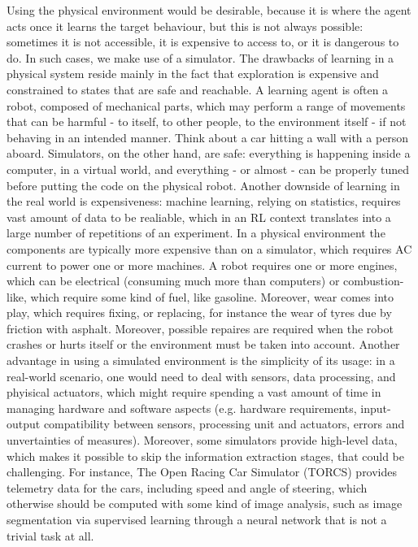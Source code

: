 Using the physical environment would be desirable, because it is where the agent acts once it learns the target behaviour, but this is not always possible: sometimes it is not accessible, it is expensive to access to, or it is dangerous to do. In such cases, we make use of a simulator. 
The drawbacks of learning in a physical system reside mainly in the fact that exploration is expensive and constrained to states that are safe and reachable. A learning agent is often a robot, composed of mechanical parts, which may perform a range of movements that can be harmful - to itself, to other people, to the environment itself - if not behaving in an intended manner. Think about a car hitting a wall with a person aboard. Simulators, on the other hand, are safe: everything is happening inside a computer, in a virtual world, and everything - or almost - can be properly tuned before putting the code on the physical robot. Another downside of learning in the real world is expensiveness: machine learning, relying on statistics, requires vast amount of data to be realiable, which in an RL context translates into a large number of repetitions of an experiment. In a physical environment the components are typically more expensive than on a simulator, which requires AC current to power one or more machines. A robot requires one or more engines, which can be electrical (consuming much more than computers) or combustion-like, which require some kind of fuel, like gasoline. Moreover, wear comes into play, which requires fixing, or replacing, for instance the wear of tyres due by friction with asphalt.  Moreover, possible repaires are required when the robot crashes or hurts itself or the environment must be taken into account. 
Another advantage in using a simulated environment is the simplicity of its usage: in a real-world scenario, one would need to deal with sensors, data processing, and phyisical actuators, which might require spending a vast amount of time in managing hardware and software aspects (e.g. hardware requirements, input-output compatibility between sensors, processing unit and actuators, errors and unvertainties of measures). Moreover, some simulators provide high-level data, which makes it possible to skip the information extraction stages, that could be challenging. For instance, The Open Racing Car Simulator (TORCS) provides telemetry data for the cars, including speed and angle of steering, which otherwise should be computed with some kind of image analysis, such as image segmentation via supervised learning through a neural network that is not a trivial task at all.
